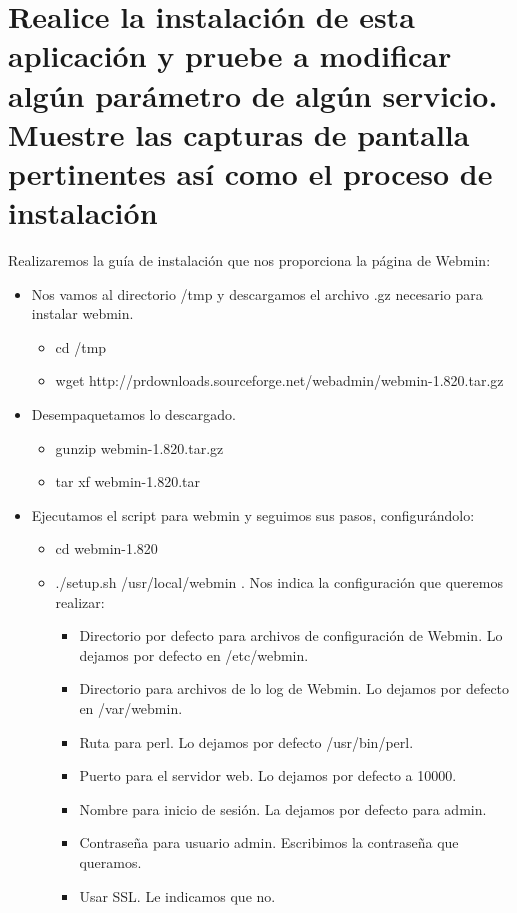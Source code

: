 	\section{Realice la instalación de esta aplicación y pruebe a modificar algún parámetro de algún servicio. Muestre las capturas de pantalla pertinentes así como el proceso de instalación}
	
	Realizaremos la guía de instalación que nos proporciona la página de Webmin\cite{ejercicio12-1}:
	
	\begin{itemize}
		\item Nos vamos al directorio /tmp y descargamos el archivo .gz necesario para instalar webmin.
		\begin{itemize}
			\item cd /tmp
			\item wget http://prdownloads.sourceforge.net/webadmin/webmin-1.820.tar.gz
		\end{itemize}
		\item Desempaquetamos lo descargado.
		\begin{itemize}
			\item gunzip webmin-1.820.tar.gz
			\item tar xf webmin-1.820.tar
		\end{itemize}
		\item Ejecutamos el script para webmin y seguimos sus pasos, configurándolo:
		\begin{itemize}
			\item cd webmin-1.820
			\item ./setup.sh /usr/local/webmin . Nos indica la configuración que queremos realizar:
			\begin{itemize}
				\item Directorio por defecto para archivos de configuración de Webmin. Lo dejamos por defecto en /etc/webmin.
				\item Directorio para archivos de lo log de Webmin. Lo dejamos por defecto en /var/webmin.
				\item Ruta para perl. Lo dejamos por defecto /usr/bin/perl.
				\item Puerto para el servidor web. Lo dejamos por defecto a 10000.
				\item Nombre para inicio de sesión. La dejamos por defecto para admin.
				\item Contraseña para usuario admin. Escribimos la contraseña que queramos.
				\item Usar SSL. Le indicamos que no.

\end{itemize}
\end{itemize}
\end{itemize}
